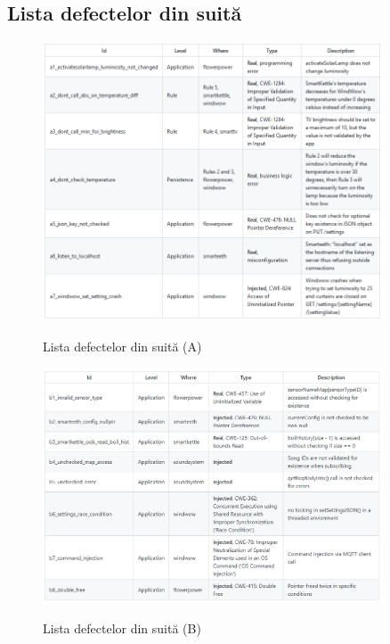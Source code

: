 \begin{appendices}

\chapter{Lista defectelor din suită}
\label{apx:defecte}

\begin{figure}[h]
    \centering
    \caption{\centering Lista defectelor din suită (A)}
    \includegraphics[width=0.9\textwidth]{images/tabel_bug2.png}
    \label{fig:tabel_bug1}
\end{figure}

\begin{figure}[h]
    \centering
    \caption{\centering Lista defectelor din suită (B)}
    \includegraphics[width=0.9\textwidth]{images/tabel_bug1.png}
    \label{fig:tabel_bug2}
\end{figure}


\end{appendices}
